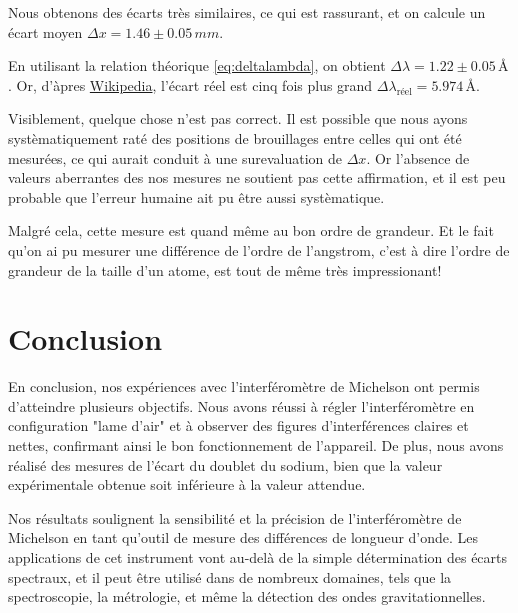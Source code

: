 \documentclass{article}
\begin{document}
Nous obtenons des écarts très similaires, ce qui est rassurant, et on calcule un écart moyen $\Delta x = 1.46 \pm 0.05 \,\unit{mm}$. 

En utilisant la relation théorique \eqref{eq:deltalambda}, on obtient $\Delta \lambda = 1.22 \pm 0.05 \,\unit{\angstrom}$. 
Or, d'àpres \href{https://fr.wikipedia.org/wiki/Doublet_du_sodium}{Wikipedia}, 
l'écart réel est cinq fois plus grand $\Delta \lambda_{\textrm{réel}} = 5.974 \,\unit{\angstrom}$.

Visiblement, quelque chose n'est pas correct. Il est possible que nous ayons systèmatiquement raté des positions de brouillages entre 
celles qui ont été mesurées, ce qui aurait conduit à une surevaluation de $\Delta x$. 
Or l'absence de valeurs aberrantes des nos mesures ne soutient pas cette affirmation, et il est peu probable que l'erreur humaine ait pu 
être aussi systèmatique.

Malgré cela, cette mesure est quand même au bon ordre de grandeur. Et le fait qu'on ai pu mesurer une différence de l'ordre de l'angstrom, 
c'est à dire l'ordre de grandeur de la taille d'un atome, est tout de même très impressionant!


\section{Conclusion}



En conclusion, nos expériences avec l'interféromètre de Michelson ont permis d'atteindre plusieurs objectifs. 
Nous avons réussi à régler l'interféromètre en configuration "lame d'air" et à observer des figures d'interférences claires et nettes, 
confirmant ainsi le bon fonctionnement de l'appareil. De plus, nous avons réalisé des mesures de l'écart du doublet du sodium, 
bien que la valeur expérimentale obtenue soit inférieure à la valeur attendue.

Nos résultats soulignent la sensibilité et la précision de l'interféromètre de Michelson en tant qu'outil de mesure des différences de longueur 
d'onde. Les applications de cet instrument vont au-delà de la simple détermination des écarts spectraux, et il peut être utilisé dans de nombreux 
domaines, tels que la spectroscopie, la métrologie, et même la détection des ondes gravitationnelles.
\end{document}
